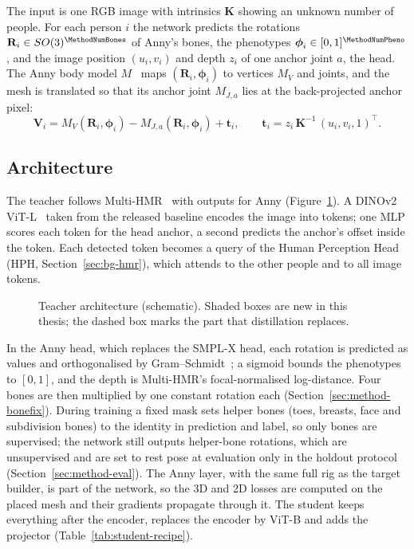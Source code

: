 The input is one RGB image with intrinsics $\mathbf{K}$ showing an unknown number of people. For each person $i$ the
network predicts the rotations
$\mathbf{R}_i\in SO(3)^{\MethodNumBones}$ of Anny's bones, the phenotypes $\boldsymbol{\phi}_i\in[0,1]^{\MethodNumPheno}$,
and the image position $(u_i,v_i)$ and depth $z_i$ of one anchor joint $a$, the head. The Anny body model
$M$~\cite{bregier2025anny} maps $(\mathbf{R}_i,\boldsymbol{\phi}_i)$ to vertices $M_V$ and joints, and the mesh is
translated so that its anchor joint $M_{J,a}$ lies at the back-projected anchor pixel:
\begin{equation}
 \mathbf{V}_i=M_V(\mathbf{R}_i,\boldsymbol{\phi}_i) - M_{J,a}(\mathbf{R}_i,\boldsymbol{\phi}_i)+\mathbf{t}_i,
 \qquad
 \mathbf{t}_i=z_i\,\mathbf{K}^{-1}\,(u_i, v_i, 1)^{\top}.
\label{eq:method-placement}
\end{equation}
\subsection{Architecture}
\label{sec:method-architecture}

The teacher follows Multi-HMR~\cite{baradel2024multihmr} with outputs for Anny (Figure~\ref{fig:architecture}). A
DINOv2 ViT-L~\cite{oquab2023dinov2} taken from the released baseline encodes the image into tokens; one MLP scores each
token for the head anchor, a second predicts the anchor's offset inside the token. Each detected token becomes a query of the Human Perception Head (HPH, Section~\ref{sec:bg-hmr}), which
attends to the other people and to all image tokens.

\begin{figure}[!htb]
  \centering
  
  \caption[Teacher decoding architecture]{Teacher architecture (schematic). Shaded boxes are new in this thesis; the
  dashed box marks the part that distillation replaces.}
  \label{fig:architecture}
\end{figure}

In the Anny head, which replaces the SMPL-X head, each rotation is predicted as \MethodRotDims{} values and
orthogonalised by Gram--Schmidt~\cite{zhou2019continuity}; a sigmoid bounds the phenotypes to $[0,1]$, and the depth
is Multi-HMR's focal-normalised log-distance. Four bones are then multiplied by one constant rotation each
(Section~\ref{sec:method-bonefix}). During training a fixed mask sets \MethodHelperBones{} helper bones (toes, breasts, face and
subdivision bones) to the identity in prediction and label, so only \MethodActiveBones{} bones are supervised; the
network still outputs helper-bone rotations, which are unsupervised and are set to rest pose at evaluation only in the
holdout protocol (Section~\ref{sec:method-eval}). The Anny layer, with the same
full rig as the target builder, is part of the network, so the 3D and 2D losses are computed on the placed mesh and
their gradients propagate through it. The student keeps everything after the encoder, replaces the encoder by ViT-B and adds the projector
(Table~\ref{tab:student-recipe}).

